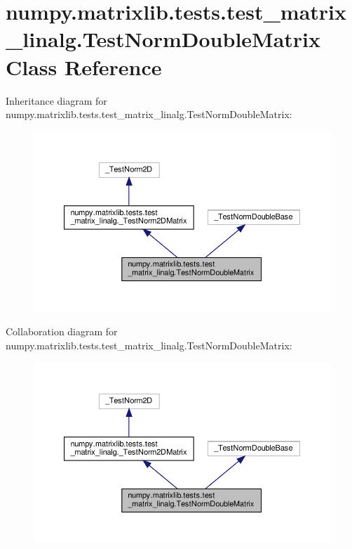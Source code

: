 \hypertarget{classnumpy_1_1matrixlib_1_1tests_1_1test__matrix__linalg_1_1TestNormDoubleMatrix}{}\section{numpy.\+matrixlib.\+tests.\+test\+\_\+matrix\+\_\+linalg.\+Test\+Norm\+Double\+Matrix Class Reference}
\label{classnumpy_1_1matrixlib_1_1tests_1_1test__matrix__linalg_1_1TestNormDoubleMatrix}


Inheritance diagram for numpy.\+matrixlib.\+tests.\+test\+\_\+matrix\+\_\+linalg.\+Test\+Norm\+Double\+Matrix\+:
\nopagebreak
\begin{figure}[H]
\begin{center}
\leavevmode
\includegraphics[width=350pt]{classnumpy_1_1matrixlib_1_1tests_1_1test__matrix__linalg_1_1TestNormDoubleMatrix__inherit__graph}
\end{center}
\end{figure}


Collaboration diagram for numpy.\+matrixlib.\+tests.\+test\+\_\+matrix\+\_\+linalg.\+Test\+Norm\+Double\+Matrix\+:
\nopagebreak
\begin{figure}[H]
\begin{center}
\leavevmode
\includegraphics[width=350pt]{classnumpy_1_1matrixlib_1_1tests_1_1test__matrix__linalg_1_1TestNormDoubleMatrix__coll__graph}
\end{center}
\end{figure}
